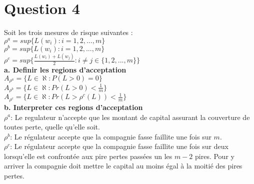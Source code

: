 \section{Question 4}

Soit les trois mesures de risque suivantes :\\
$\rho^a= sup\{L(w_i) : i= 1,2,...,m\}$\\
$\rho^b=  sup\{L(w_i) : i= 1,2,...,m\}$\\
$\rho^c= sup\{\frac{L(w_i)+L(w_j)}{2} : i \neq j \in \{1,2,...,m\}\}$\\

\textbf{a. Definir les regions d'acceptation}\\
$A_{\rho^{a}} = \{ L \in \aleph : P(L>0) = 0  \} $\\
$A_{\rho^{b}} = \{ L \in \aleph : Pr(L>0) < \frac{1}{m} \} $\\
$A_{\rho^{c}} = \{ L \in \aleph : Pr(L>\rho^c(L)) < \frac{1}{m} \} $\\

\textbf{b. Interpreter ces regions d'acceptation}\\
$\rho^a$: Le regulateur n'accepte que les montant de capital assurant la couverture de toutes perte, quelle qu'elle soit.\\
$\rho^b$: Le régulateur accepte que la compagnie fasse faillite une fois sur $m$.\\
$\rho^c$: Le régulateur accepte que la compagnie fasse faillite une fois sur deux lorsqu'elle est confrontée aux pire pertes passées un les $m-2$ pires. Pour y arriver la compagnie doit mettre le capital au moins égal à la moitié des pires pertes.\\
